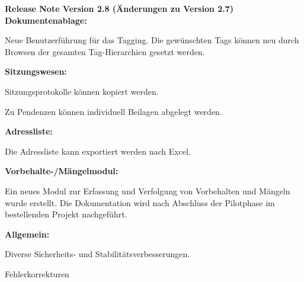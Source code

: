 \textbf{Release Note Version 2.8 (Änderungen zu Version 2.7)} \\
\textbf{Dokumentenablage:}
\begin{compactitem}
	\item Neue Benutzerführung für das Tagging. Die gewünschten Tags können neu durch Browsen der gesamten Tag-Hierarchien gesetzt werden.
\end{compactitem}
\textbf{Sitzungswesen:}
\begin{compactitem}
	\item Sitzungsprotokolle können kopiert werden.
	\item Zu Pendenzen können individuell Beilagen abgelegt werden.
\end{compactitem}
\textbf{Adressliste:}
\begin{compactitem}
	\item Die Adressliste kann exportiert werden nach Excel.
\end{compactitem}
\textbf{Vorbehalte-/Mängelmodul:}
\begin{compactitem}
	\item Ein neues Modul zur Erfassung und Verfolgung von Vorbehalten und Mängeln wurde erstellt. Die Dokumentation wird nach Abschluss der Pilotphase im bestellenden Projekt nachgeführt.
\end{compactitem}
\textbf{Allgemein:}
\begin{compactitem}
	\item Diverse Sicherheits- und Stabilitätsverbesserungen.
	\item Fehlerkorrekturen
\end{compactitem}
\vspace{\baselineskip}

